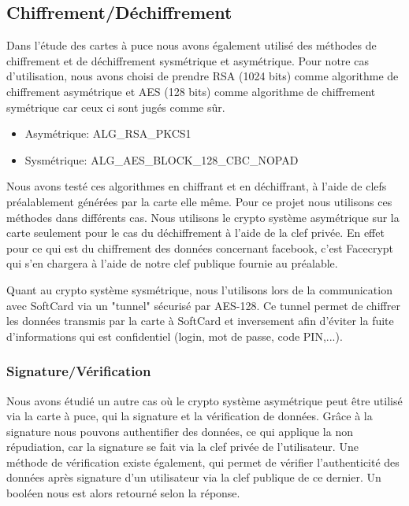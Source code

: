 \documentclass[a4paper,11pt,french]{article}
\begin{document}
\subsection{Chiffrement/Déchiffrement}
Dans l'étude des cartes à puce nous avons également utilisé des méthodes de chiffrement et de déchiffrement sysmétrique et asymétrique.
Pour notre cas d'utilisation, nous avons choisi de prendre RSA (1024 bits) comme algorithme de chiffrement asymétrique et AES (128 bits)
comme algorithme de chiffrement symétrique car ceux ci sont jugés comme sûr.
\begin{itemize}
	\item Asymétrique: ALG\_RSA\_PKCS1
	\item Sysmétrique: ALG\_AES\_BLOCK\_128\_CBC\_NOPAD 
\end{itemize}


Nous avons testé ces algorithmes en chiffrant et en déchiffrant, à l'aide de clefs préalablement générées par la carte
elle même. Pour ce projet nous utilisons ces méthodes dans différents cas. Nous utilisons le crypto système asymétrique
sur la carte seulement pour le cas du déchiffrement à l'aide de la clef privée. En effet pour ce qui est du chiffrement
des données concernant facebook, c'est Facecrypt qui s'en chargera à l'aide de notre clef publique fournie au préalable.

Quant au crypto système sysmétrique, nous l'utilisons lors de la communication avec SoftCard
via un "tunnel" sécurisé par AES-128. Ce tunnel permet de chiffrer les données transmis par la carte à SoftCard et inversement afin
d'éviter la fuite d'informations qui est confidentiel (login, mot de passe, code PIN,...). \\

\subsubsection{Signature/Vérification}
Nous avons étudié un autre cas où le crypto système asymétrique peut être utilisé via la carte à puce, qui la signature et la
vérification de données. Grâce à la signature nous pouvons authentifier des données, ce qui applique la non répudiation, car la signature se fait via la clef privée de l'utilisateur. Une méthode de vérification existe également, qui permet de vérifier l'authenticité des données
après signature d'un utilisateur via la clef publique de ce dernier. Un booléen nous est alors retourné selon la réponse.
\end{document}
